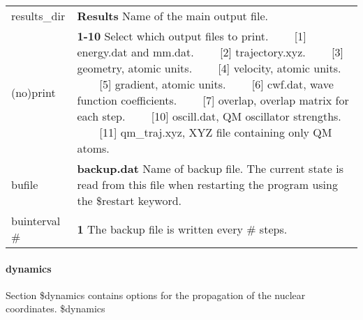 \documentclass{report}
\newcommand{\tabitem}{~~\llap{--}~~}
\begin{document}
\begin{tabularx}{\textwidth}{ m{2.5cm} X }
results\_dir &
	\textbf{Results} \newline
	Name of the main output file. \\

(no)print		&
	\textbf{1-10} \newline
	Select which output files to print. \newline
	\tabitem [1]   energy.dat and mm.dat. \newline
	\tabitem [2]   trajectory.xyz. \newline
	\tabitem [3]   geometry, atomic units. \newline
	\tabitem [4]   velocity, atomic units. \newline
	\tabitem [5]   gradient, atomic units. \newline
	\tabitem [6]   cwf.dat, wave function coefficients. \newline
	\tabitem [7]   overlap, overlap matrix for each step. \newline
	\tabitem [10]  oscill.dat, QM oscillator strengths. \newline
	\tabitem [11]  qm\_traj.xyz, XYZ file containing only QM atoms. \\

bufile			&
	\textbf{backup.dat} \newline
	Name of backup file. The current state is read from this file when restarting the program using the \$restart keyword. \\
	
buinterval \#	&
	\textbf{1} \newline
	The backup file is written every \# steps. \\
\end{tabularx}


\paragraph{dynamics}
Section \$dynamics contains options for the propagation of the nuclear coordinates. \newline
\$dynamics
\end{document}

